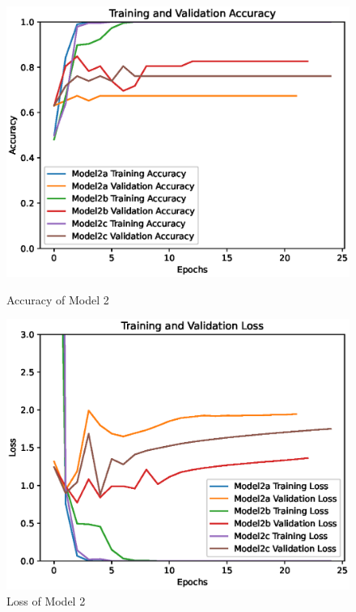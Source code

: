 \begin{figure}
    \centering
    \begin{minipage}{0.49\textwidth}
        \centering
        \includegraphics[width=\textwidth]{./fig/model2/accuracy22.eps}
        \caption{Accuracy of Model 2}
        \label{fig:model22_acc}
    \end{minipage}
    \begin{minipage}{0.49\textwidth}
        \centering
        \includegraphics[width=\textwidth]{./fig/model2/loss22.eps}
        \caption{Loss of Model 2}
        \label{fig:model22_loss}
    \end{minipage}
\end{figure}


